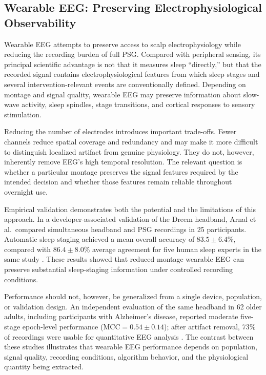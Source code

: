 \subsection{Wearable EEG: Preserving Electrophysiological Observability}

Wearable EEG attempts to preserve access to scalp electrophysiology while
reducing the recording burden of full PSG. Compared with peripheral sensing,
its principal scientific advantage is not that it measures sleep ``directly,''
but that the recorded signal contains electrophysiological features from which
sleep stages and several intervention-relevant events are conventionally
defined. Depending on montage and signal quality, wearable EEG may preserve
information about slow-wave activity, sleep spindles, stage transitions, and
cortical responses to sensory stimulation.

Reducing the number of electrodes introduces important trade-offs. Fewer
channels reduce spatial coverage and redundancy and may make it more difficult
to distinguish localized artifact from genuine physiology. They do not,
however, inherently remove EEG's high temporal resolution. The relevant
question is whether a particular montage preserves the signal features required
by the intended decision and whether those features remain reliable throughout
overnight use.

Empirical validation demonstrates both the potential and the limitations of
this approach. In a developer-associated validation of the Dreem headband,
Arnal et al.\ compared simultaneous headband and PSG recordings in 25
participants. Automatic sleep staging achieved a mean overall accuracy of
\(83.5\pm6.4\%\), compared with \(86.4\pm8.0\%\) average agreement for five
human sleep experts in the same study
\citep{arnal2020dreem}. These results showed that reduced-montage wearable EEG
can preserve substantial sleep-staging information under controlled recording
conditions.

Performance should not, however, be generalized from a single device,
population, or validation design. An independent evaluation of the same
headband in 62 older adults, including participants with Alzheimer's disease,
reported moderate five-stage epoch-level performance
(\(\mathrm{MCC}=0.54\pm0.14\)); after artifact removal, 73\% of recordings were
usable for quantitative EEG analysis
\citep{ravindran2025dreem}. The contrast between these studies illustrates that
wearable EEG performance depends on population, signal quality, recording
conditions, algorithm behavior, and the physiological quantity being extracted.

